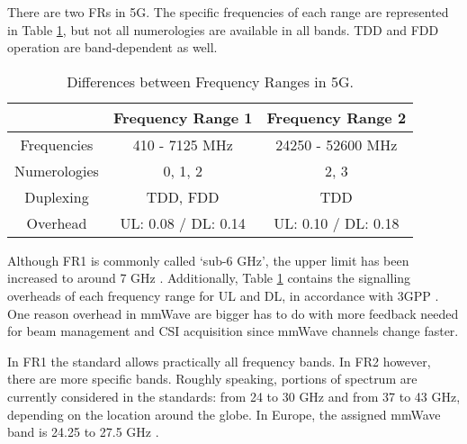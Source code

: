 There are two \acp{FR} in 5G. The specific frequencies of each range are represented in Table \ref{tab:frs}, but not all numerologies are available in all bands. \ac{TDD} and \ac{FDD} operation are band-dependent as well. 

\begin{table}[h]
    \centering
    \caption{Differences between Frequency Ranges in 5G.}
    \label{tab:frs}
    \begin{tabular}{c|c|c|}
        \cline{2-3}
        \multicolumn{1}{l|}{}              & Frequency Range 1 & Frequency Range 2 \\ \hline
        \multicolumn{1}{|c|}{Frequencies}  & 410 - 7125 MHz    & 24250 - 52600 MHz \\ \hline
        \multicolumn{1}{|c|}{Numerologies} & 0, 1, 2        & 2, 3           \\ \hline
        \multicolumn{1}{|c|}{Duplexing}    & TDD, FDD       & TDD               \\ \hline
        \multicolumn{1}{|c|}{Overhead}    & UL: 0.08 / DL: 0.14      & UL: 0.10 / DL: 0.18               \\ \hline
    \end{tabular}
\end{table}




Although \ac{FR}1 is commonly called `sub-6 GHz', the upper limit has been increased to around 7 GHz \cite{3gpp_bands}. Additionally, Table \ref{tab:frs} contains the signalling overheads of each frequency range for UL and DL, in accordance with 3GPP \cite{3gpp_overheads}. One reason overhead in mmWave are bigger has to do with more feedback needed for beam management and CSI acquisition since mmWave channels change faster.



In FR1 the standard allows practically all frequency bands. In FR2 however, there are more specific bands. Roughly speaking, portions of spectrum are currently considered in the standards: from 24 to 30 GHz and from 37 to 43 GHz, depending on the location around the globe. In Europe, the assigned mmWave band is 24.25 to 27.5 GHz \cite{5g_2020}.
